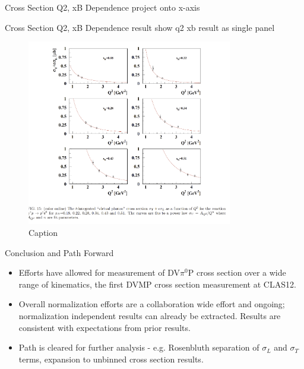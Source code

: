 \documentclass[aspectratio=169]{beamer}
\begin{document}
\begin{frame}{Cross Section Q2, xB Dependence}
project onto x-axis
\end{frame}

\begin{frame}{Cross Section Q2, xB Dependence result}
show q2 xb result as single panel

\begin{figure}
    \centering
    \includegraphics[width=0.8\textwidth]{defense/q2_int.png}
    \caption{Caption}
    \label{fig:enter-label}
\end{figure}
\end{frame}
\fi


\begin{frame}{Conclusion and Path Forward}
\begin{itemize}
    \setlength\itemsep{1em}
    \item Efforts have allowed for measurement of DV$\pi^0$P cross section over a wide range of kinematics, the first DVMP cross section measurement at CLAS12.
    \item Overall normalization efforts are a collaboration wide effort and ongoing; normalization independent results can already be extracted.  Results are consistent with expectations from prior results.
    \item Path is cleared for further analysis - e.g. Rosenbluth separation of $\sigma_L$ and $\sigma_T$ terms, expansion to unbinned cross section results.
    
\end{itemize}


\end{frame}
    
\end{document}
